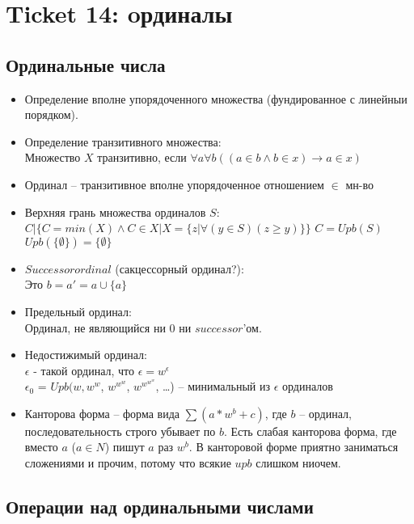 \section{Ticket 14: oрдиналы}
\label{sec-16}
\subsection{Ординальные числа}
\label{sec-16-1}
\begin{itemize}
\item Определение вполне упорядоченного множества (фундированное
с линейныи порядком).
\item Определение транзитивного множества:\\
Множество $X$ транзитивно, если
$\forall a \forall b((a \in b \land b \in x) \to a \in x)$
\item Ординал -- транзитивное вполне упорядоченное отношением $\in$ мн-во
\item Верхняя грань множества ординалов $S$:\\
$C | \{C = min(X) \land C \in X | X = \{z | \forall (y \in S)(z \geq y)\}\}$
$C = Upb(S)$
$Upb(\{\emptyset\}) = \{\emptyset\}$
\item $Successor ordinal$ (сакцессорный ординал?):\\
Это $b = a' = a \cup \{a\}$
\item Предельный ординал:\\
Ординал, не являющийся ни $0$ ни $successor$'ом.
\item Недостижимый ординал:\\
$\epsilon$ - такой ординал, что $\epsilon = w^{\epsilon}$\\
$\epsilon_0$ = $Upb(w, w^{w}$, $w^{w^{w}}$, $w^{w^{w^w}}$, \dots) -- минимальный из $\epsilon$ ординалов
\item Канторова форма -- форма вида $\sum(a*w^b+c)$, где $b$ -- ординал, последовательность строго убывает по $b$. Есть слабая канторова форма, где вместо $a$ ($a \in N$) пишут $a$ раз $w^b$. В канторовой форме приятно заниматься сложениями и прочим, потому что всякие $upb$ слишком ниочем.
\end{itemize}
\subsection{Операции над ординальными числами}
\label{sec-16-2}
